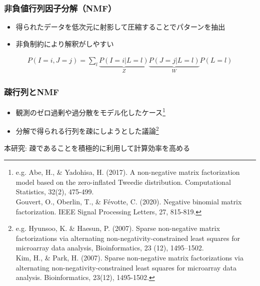 \documentclass[dvipdfmx, dvipsnames]{beamer}
\begin{document}
\begin{frame}
\frametitle{非負値行列因子分解（NMF）}
\begin{itemize}
\item 得られたデータを低次元に射影して圧縮することでパターンを抽出
\item 非負制約により解釈がしやすい 
\end{itemize}

\begin{figure}

\end{figure}

\begin{align*}
P(I=i , J=j) = \sum_l  \underbrace{P(I=i |L= l)}_{Z}  \underbrace{P(J=j |L= l)}_{W} P(L=l)
\end{align*}

\end{frame}

\begin{frame}
\frametitle{疎行列とNMF}
\begin{itemize}
\item 観測のゼロ過剰や過分散をモデル化したケース\footnote{e.g. Abe, H., \& Yadohisa, H. (2017). A non-negative matrix factorization model based on the zero-inflated Tweedie distribution. Computational Statistics, 32(2), 475-499. \\ Gouvert, O., Oberlin, T., \& F\'evotte, C. (2020). Negative binomial matrix factorization. IEEE Signal Processing Letters, 27, 815-819.}
\item 分解で得られる行列を疎にしようとした議論\footnote{e.g.  Hyunsoo, K. \&  Haesun, P. (2007). Sparse non-negative matrix factorizations via alternating non-negativity-constrained least squares for microarray data analysis, Bioinformatics,  23 (12), 1495--1502. \\ Kim, H., \& Park, H. (2007). Sparse non-negative matrix factorizations via alternating non-negativity-constrained least squares for microarray data analysis. Bioinformatics, 23(12), 1495-1502.}
 \end{itemize}

\vfill

本研究: 疎であることを積極的に利用して計算効率を高める
\end{frame}
 
\end{document}

